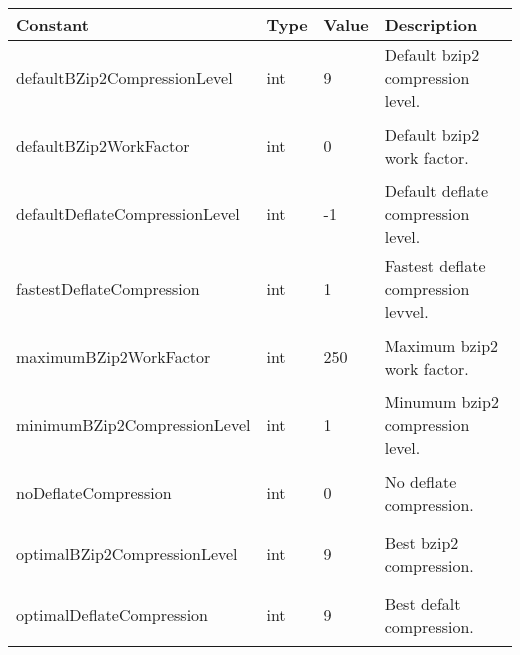 \documentclass[a4paper,oneside,11.000000pt]{book}
\begin{document}
\begin{flushleft}
\begin{supertabular}[l]{!{\raggedright}p{3.6125cm}!{\raggedright}p{1.17735cm}!{\raggedright}p{1.32877cm}!{\raggedright}p{5.89623cm}}
\textbf{Constant}
& \textbf{Type}
& \textbf{Value}
& \textbf{Description}
\\
\hline
\hypertarget{System.IO.Compression.defaultBZip2CompressionLevel}{defaultBZip2CompressionLevel}
& int
& 9
& Default bzip2 compression level.

\\
\hypertarget{System.IO.Compression.defaultBZip2WorkFactor}{defaultBZip2WorkFactor}
& int
& 0
& Default bzip2 work factor.

\\
\hypertarget{System.IO.Compression.defaultDeflateCompressionLevel}{defaultDeflateCompressionLevel}
& int
& -1
& Default deflate compression level.

\\
\hypertarget{System.IO.Compression.fastestDeflateCompression}{fastestDeflateCompression}
& int
& 1
& Fastest deflate compression levvel.

\\
\hypertarget{System.IO.Compression.maximumBZip2WorkFactor}{maximumBZip2WorkFactor}
& int
& 250
& Maximum bzip2 work factor.

\\
\hypertarget{System.IO.Compression.minimumBZip2CompressionLevel}{minimumBZip2CompressionLevel}
& int
& 1
& Minumum bzip2 compression level.

\\
\hypertarget{System.IO.Compression.noDeflateCompression}{noDeflateCompression}
& int
& 0
& No deflate compression.

\\
\hypertarget{System.IO.Compression.optimalBZip2CompressionLevel}{optimalBZip2CompressionLevel}
& int
& 9
& Best bzip2 compression.

\\
\hypertarget{System.IO.Compression.optimalDeflateCompression}{optimalDeflateCompression}
& int
& 9
& Best defalt compression.

\\
\end{supertabular}

\end{flushleft}
\clearpage
\end{document}
